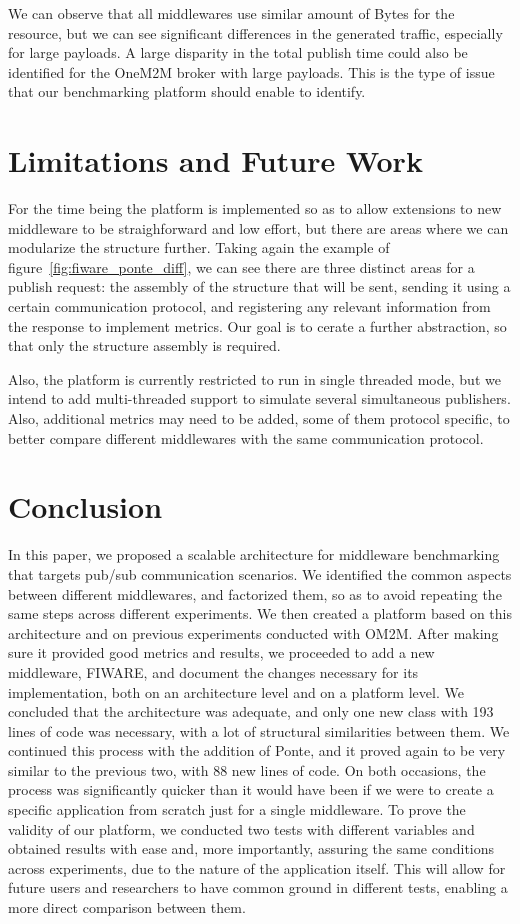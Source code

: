 \documentclass[conference]{IEEEtran}
\begin{document}
We can observe that all middlewares use similar amount of Bytes for the resource, but we can see significant differences in the generated traffic, especially for large payloads. A large disparity in the total publish time could also be identified for the OneM2M broker with large payloads. This is the type of issue that our benchmarking platform should enable to identify. 

\section{Limitations and Future Work}
For the time being the platform is implemented so as to allow extensions to new middleware to be straighforward and low effort, but there are areas where we can modularize the structure further. Taking again the example of figure~\ref{fig:fiware_ponte_diff}, we can see there are three distinct areas for a publish request: the assembly of the structure that will be sent, sending it using a certain communication protocol, and registering any relevant information from the response to implement metrics. Our goal is to cerate a further abstraction, so that only the structure assembly is required. 

Also, the platform is currently restricted to run in single threaded mode, but we intend to add multi-threaded support to simulate several simultaneous publishers. Also, additional metrics may need to be added, some of them protocol specific, to better compare different middlewares with the same communication protocol. 

\section{Conclusion}

In this paper, we proposed a scalable architecture for middleware benchmarking that targets pub/sub communication scenarios. We identified the common aspects between different middlewares, and factorized them, so as to avoid repeating the same steps across different experiments. We then created a platform based on this architecture and on previous experiments conducted with OM2M. After making sure it provided good metrics and results, we proceeded to add a new middleware, FIWARE, and document the changes necessary for its implementation, both on an architecture level and on a platform level. We concluded that the architecture was adequate, and only one new class with 193 lines of code was necessary, with a lot of structural similarities between them. We continued this process with the addition of Ponte, and it proved again to be very similar to the previous two, with 88 new lines of code. On both occasions, the process was significantly quicker than it would have been if we were to create a specific application from scratch just for a single middleware. To prove the validity of our platform, we conducted two tests with different variables and obtained results with ease and, more importantly, assuring the same conditions across experiments, due to the nature of the application itself. This will allow for future users and researchers to have common ground in different tests, enabling a more direct comparison between them.
\end{document}
